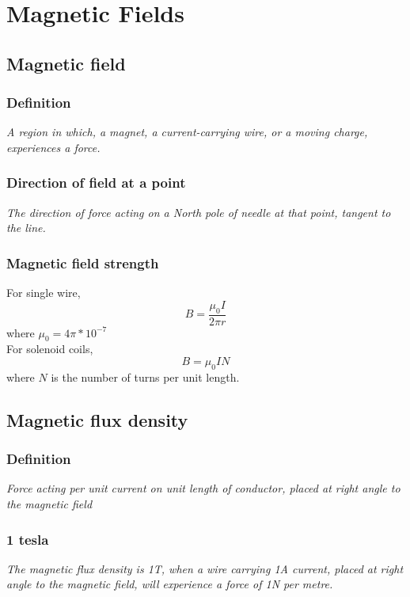 \documentclass[a4paper,9pt]{scrartcl}
\begin{document}
    \section{Magnetic Fields}

    \subsection{Magnetic field}

    \subsubsection{Definition}
    \textit{A region in which, a magnet, a current-carrying wire, or a moving charge, experiences a force.}

    \subsubsection{Direction of field at a point}
    \textit{The direction of force acting on a North pole of needle at that point, tangent to the line.}

    \subsubsection{Magnetic field strength}
    For single wire,
    \begin{displaymath}
        B = \frac{{\mu_0}I}{2{\pi}r}
    \end{displaymath}
    where $\mu_0 = 4\pi*10^{-7}$ \\

    For solenoid coils,
    \begin{displaymath}
        B = {\mu_0}IN
    \end{displaymath}
    where $N$ is the number of turns per unit length.

    \subsection{Magnetic flux density}

    \subsubsection{Definition}
    \textit{Force acting per unit current on unit length of conductor, placed at right angle to the magnetic field}

    \subsubsection{1 tesla}
    \textit{The magnetic flux density is 1T, when a wire carrying 1A current, placed at right angle to the magnetic field, will experience a force of 1N per metre.}
\end{document}

